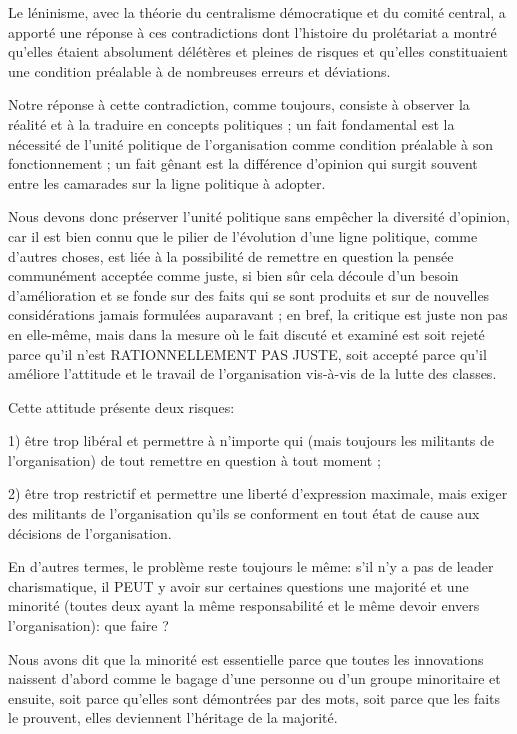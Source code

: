 Le léninisme, avec la théorie du centralisme démocratique et du comité central, a apporté une réponse à ces contradictions dont l'histoire du prolétariat a montré qu'elles étaient absolument délétères et pleines de risques et qu'elles constituaient une condition préalable à de nombreuses erreurs et déviations.

Notre réponse à cette contradiction, comme toujours, consiste à observer la réalité et à la traduire en concepts politiques ; un fait fondamental est la nécessité de l'unité politique de l'organisation comme condition préalable à son fonctionnement ; un fait gênant est la différence d'opinion qui surgit souvent entre les camarades sur la ligne politique à adopter.

Nous devons donc préserver l'unité politique sans empêcher la diversité d'opinion, car il est bien connu que le pilier de l'évolution d'une ligne politique, comme d'autres choses, est liée à la possibilité de remettre en question la pensée communément acceptée comme juste, si bien sûr cela découle d'un besoin d'amélioration et se fonde sur des faits qui se sont produits et sur de nouvelles considérations jamais formulées auparavant ; en bref, la critique est juste non pas en elle-même, mais dans la mesure où le fait discuté et examiné est soit rejeté parce qu'il n'est RATIONNELLEMENT PAS JUSTE, soit accepté parce qu'il améliore l'attitude et le travail de l'organisation vis-à-vis de la lutte des classes.

Cette attitude présente deux risques:

1) être trop libéral et permettre à n'importe qui (mais toujours les militants de l'organisation) de tout remettre en question à tout moment ;

2) être trop restrictif et permettre une liberté d'expression maximale, mais exiger des militants de l'organisation qu'ils se conforment en tout état de cause aux décisions de l'organisation.

En d'autres termes, le problème reste toujours le même: s'il n'y a pas de leader charismatique, il PEUT y avoir sur certaines questions une majorité et une minorité (toutes deux ayant la même responsabilité et le même devoir envers l'organisation): que faire ?

Nous avons dit que la minorité est essentielle parce que toutes les innovations naissent d'abord comme le bagage d'une personne ou d'un groupe minoritaire et ensuite, soit parce qu'elles sont démontrées par des mots, soit parce que les faits le prouvent, elles deviennent l'héritage de la majorité.

